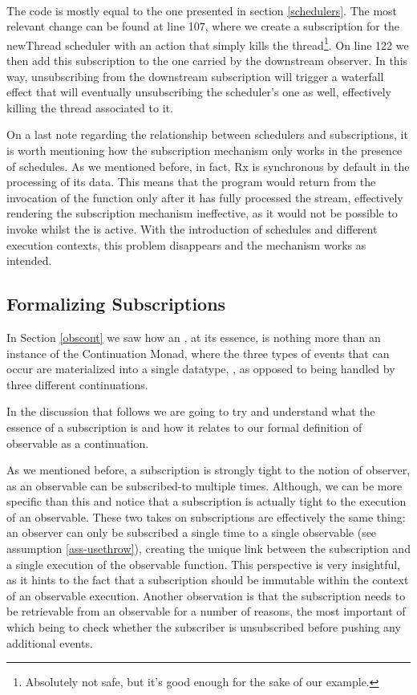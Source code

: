 \\

The code is mostly equal to the one presented in section \ref{schedulers}. The most relevant change can be found at line 107, where we create a subscription for the newThread scheduler with an action that simply kills the thread\footnote{Absolutely not safe, but it's good enough for the sake of our example.}. On line 122 we then add this subscription to the one carried by the downstream observer. In this way, unsubscribing from the downstream subscription will trigger a waterfall effect that will eventually unsubscribing the scheduler's one as well, effectively killing the thread associated to it.

On a last note regarding the relationship between schedulers and subscriptions, it is worth mentioning how the subscription mechanism only works in the presence of schedules. As we mentioned before, in fact, Rx is synchronous by default in the processing of its data. This means that the program would return from the invocation of the  function only after it has fully processed the stream, effectively rendering the subscription mechanism ineffective, as it would not be possible to invoke  whilst the  is active. With the introduction of schedules and different execution contexts, this problem disappears and the mechanism works as intended.

\subsection{Formalizing Subscriptions}

In Section \ref{obscont} we saw how an , at its essence, is nothing more than an instance of the Continuation Monad, where the three types of events that can occur are materialized into a single datatype, , as opposed to being handled by three different continuations.

In the discussion that follows we are going to try and understand what the essence of a subscription is and how it relates to our formal definition of observable as a continuation. 

As we mentioned before, a subscription is strongly tight to the notion of observer, as an observable can be subscribed-to multiple times. Although, we can be more specific than this and notice that a subscription is actually tight to the execution of an observable. These two takes on subscriptions are effectively the same thing: an observer can only be subscribed a single time to a single observable (see assumption \ref{ass-usethrow}), creating the unique link between the subscription and a single execution of the observable function. This perspective is very insightful, as it hints to the fact that a subscription should be immutable within the context of an observable execution. Another observation is that the subscription needs to be retrievable from an observable for a number of reasons, the most important of which being to check whether the subscriber is unsubscribed before pushing any additional events.

